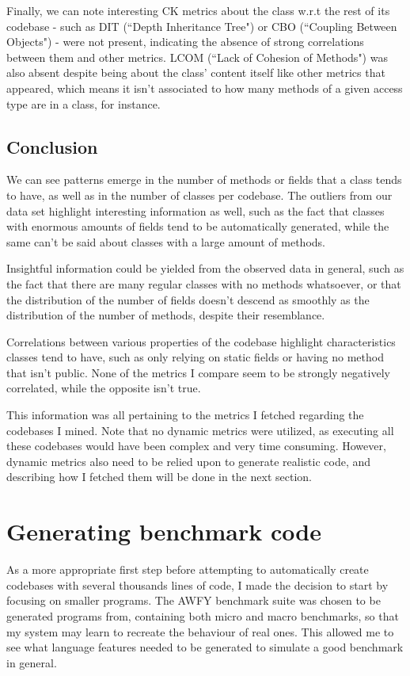 \documentclass[12pt]{article}
\begin{document}
\bigskip
Finally, we can note interesting CK metrics about the class w.r.t the rest of its codebase - such as DIT (``Depth Inheritance Tree") or CBO (``Coupling Between Objects") - were not present, indicating the absence of strong correlations between them and other metrics. LCOM (``Lack of Cohesion of Methods") was also absent despite being about the class' content itself like other metrics that appeared, which means it isn't associated to how many methods of a given access type are in a class, for instance.

\clearpage
\subsection{Conclusion}
\label{section:switch_to_dynamic}

We can see patterns emerge in the number of methods or fields that a class tends to have, as well as in the number of classes per codebase. The outliers from our data set highlight interesting information as well, such as the fact that classes with enormous amounts of fields tend to be automatically generated, while the same can't be said about classes with a large amount of methods. 

Insightful information could be yielded from the observed data in general, such as the fact that there are many regular classes with no methods whatsoever, or that the distribution of the number of fields doesn't descend as smoothly as the distribution of the number of methods, despite their resemblance.

Correlations between various properties of the codebase highlight characteristics classes tend to have, such as only relying on static fields or having no method that isn't public. None of the metrics I compare seem to be strongly negatively correlated, while the opposite isn't true.

This information was all pertaining to the metrics I fetched regarding the codebases I mined. Note that no dynamic metrics were utilized, as executing all these codebases would have been complex and very time consuming. However, dynamic metrics also need to be relied upon to generate realistic code, and describing how I fetched them will be done in the next section.

\clearpage
\section{Generating benchmark code}
As a more appropriate first step before attempting to automatically create codebases with several thousands lines of code, I made the decision to start by focusing on smaller programs. The AWFY benchmark suite \cite{awfy} was chosen to be generated programs from, containing both micro and macro benchmarks, so that my system may learn to recreate the behaviour of real ones. This allowed me to see what language features needed to be generated to simulate a good benchmark in general.
\end{document}
